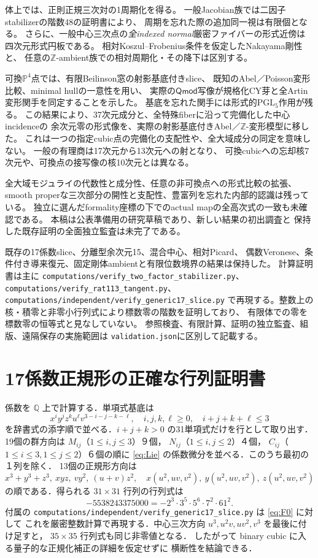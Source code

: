 \documentclass[11pt,a4paper]{ltjsarticle}
\numberwithin{equation}{section}
\newcommand{\PP}{\mathbb P}
\newcommand{\PGL}{\mathrm{PGL}}
\begin{document}
体上では、正則正規三次対の1周期化を得る。
一般Jacobian族では二因子stabilizerの階数48の証明書により、
周期を忘れた際の追加同一視は有限個となる。
さらに、一般中心三次点の\emph{全indexed normal}厳密ファイバーの形式近傍は
四次元形式円板である。
相対Koszul--Frobenius条件を仮定したNakayama剛性と、
任意の$\mathbb Z$-ambient族での相対周期化・その降下は区別する。

可換$\PP^4$点では、有限Beilinson窓の射影基底付きslice、
既知のAbel／Poisson変形比較、minimal hullの一意性を用い、
実際の$\mathsf{Qmod}$写像が規格化CY芽と全Artin変形関手を同定することを示した。
基底を忘れた関手には形式的$\PGL_5$作用が残る。
この結果により、37次元成分と、全特殊fiberに沿って完備化した中心incidenceの
余次元零の形式像を、実際の射影基底付きAbel／$\mathbb Z$-変形模型に移した。
これは一つの指定cubic点の完備化の支配性や、全大域成分の同定を意味しない。
一般の有理商は17次元から13次元への射となり、
可換cubicへの忘却核7次元や、可換点の接写像の核10次元とは異なる。

全大域モジュライの代数性と成分性、任意の非可換点への形式比較の拡張、
smooth properな三次部分の開性と支配性、豊富列を忘れた内部的認識は残っている。
独立に選んだformality座標の下でのactual mapの全高次式の一致も未確認である。
本稿は公表準備用の研究草稿であり、新しい結果の初出調査と
保持した既存証明の全面独立監査は未完了である。

既存の17係数slice、分離型余次元15、混合中心、相対Picard、
偶数Veronese、条件付き導来復元、固定剛体ambientと有限位数境界の結果は保持した。
計算証明書は主に
\nolinkurl{computations/verify_two_factor_stabilizer.py}、
\nolinkurl{computations/verify_rat113_tangent.py}、
\nolinkurl{computations/independent/verify_generic17_slice.py}
で再現する。整数上の核・積零と非零小行列式により標数零の階数を証明しており、
有限体での零を標数零の恒等式と見なしていない。
参照検査、有限計算、証明の独立監査、組版、遠隔保存の実施範囲は
\nolinkurl{validation.json}に区別して記載する。

\appendix
\section{17係数正規形の正確な行列証明書}\label{app:rank}
係数を $\mathbb Q$ 上で計算する．単項式基底は
\[
 x^iy^jz^ku^\ell v^{3-i-j-k-\ell},\quad
 i,j,k,\ell\ge0,\quad i+j+k+\ell\le3
\]
を辞書式の添字順で並べる．$i+j+k>0$ の31単項式だけを行として取り出す．
19個の群方向は $M_{ij}$（$1\le i,j\le3$）９個，
$N_{ij}$（$1\le i,j\le2$）４個，
$C_{ij}$（$1\le i\le3,1\le j\le2$）６個の順に
\eqref{eq:Lie} の係数微分を並べる．このうち最初の１列を除く．
13個の正規形方向は
\[
 x^3+y^3+z^3,\ xyz,\ vy^2,\ (u+v)z^2,\quad
 x(u^2,uv,v^2),\ y(u^2,uv,v^2),\ z(u^2,uv,v^2)
\]
の順である．得られる $31\times31$ 行列の行列式は
\[
 -5538243375000=-2^3\cdot3^5\cdot5^6\cdot7^2\cdot61^2.
\]
付属の \nolinkurl{computations/independent/verify_generic17_slice.py} は \eqref{eq:F0} に対して
これを厳密整数計算で再現する．中心三次方向
$u^3,u^2v,uv^2,v^3$ を最後に付け足すと，
$35\times35$ 行列式も同じ非零値となる．
したがって binary cubic に入る量子的な正規化補正の詳細を仮定せずに
横断性を結論できる．
\end{document}
